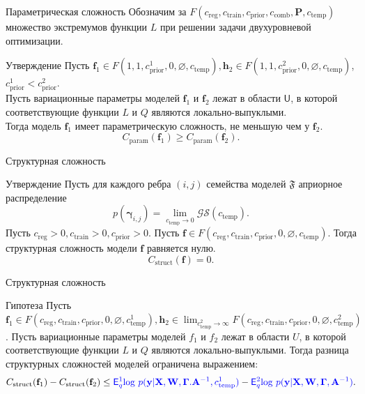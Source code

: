 \documentclass[usenames,dvipsnames,10pt,pdf,utf8,russian,aspectratio=43]{beamer}
\begin{document}
\begin{frame}{Параметрическая сложность}
Обозначим за $F(c_{\text{reg}}, c_{\text{train}}, c_{\text{prior}}, c_{\text{comb}}, \mathbf{P}, c_{\text{temp}})$ множество экстремумов функции $L$ при решении задачи двухуровневой оптимизации.
\begin{block}{Утверждение}
Пусть $\mathbf{f}_1 \in F(1, 1, c_{\text{prior}}^1, 0, \varnothing,  c_{\text{temp}} ), \mathbf{h}_2 \in F(1, 1, c_{\text{prior}}^2, 0, \varnothing,  c_{\text{temp}})$, $c_{\text{prior}}^1 < c_{\text{prior}}^2$.\\
Пусть вариационные параметры моделей $\mathbf{f}_1$ и $\mathbf{f}_2$ лежат в области $\mathsf{U}$, в которой соответствующие функции $L$ и $Q$ являются локально-выпуклыми.\\ 
Тогда модель $\mathbf{f}_1$ имеет параметрическую сложность, не меньшую чем у $\mathbf{f}_2$.
\[
    C_\text{param}(\mathbf{f}_1) \geq C_\text{param}(\mathbf{f}_2).
\]
\end{block}


\end{frame}

\begin{frame}{Структурная сложность}

\begin{block}{Утверждение}
Пусть для каждого ребра $(i,j)$ семейства моделей $\mathfrak{F}$ априорное распределение $$p(\boldsymbol{\gamma}_{i,j}) =  \lim_{c_{\text{temp}} \to 0} \mathcal{GS}(c_{\text{temp}}).$$
Пусть $c_{\text{reg}} >0, c_{\text{train}} >0, c_{\text{prior}}>0$.
Пусть $\mathbf{f} \in F(c_{\text{reg}}, c_{\text{train}}, c_{\text{prior}}, 0, \varnothing, c_{\text{temp}})$.
Тогда структурная сложность модели $\mathbf{f}$ равняется нулю.
\[
    C_\text{struct}(\mathbf{f}) = 0.
\]
\end{block}
\end{frame}

\begin{frame}{Структурная сложность}
\begin{block}{Гипотеза}
Пусть $\mathbf{f}_1 \in F(c_{\text{reg}}, c_{\text{train}},  c_{\text{prior}}, 0, \varnothing,  c^1_{\text{temp}}), \mathbf{h}_2   \in \lim_{c^2_{\text{temp}} \to \infty} F(c_{\text{reg}}, c_{\text{train}},  c_{\text{prior}}, 0, \varnothing,  c^2_{\text{temp}})$.
Пусть вариационные параметры моделей $f_1$ и $f_2$ лежат в области $U$, в которой соответствующие функции $L$ и $Q$ являются локально-выпуклыми. 
Тогда разница структурных сложностей моделей ограничена выражением:
\[
    C_\text{struct}(\mathbf{f}_1)  - C_\text{struct}(\mathbf{f}_2) \leq \textcolor{blue}{\mathsf{E}_q^1 \text{log}~{p(\mathbf{y} | \mathbf{X}, \mathbf{W}, \boldsymbol{\Gamma}. \mathbf{A}^{-1}, c^1_{\text{temp}})}} - \textcolor{blue}{\mathsf{E}_q^2 \text{log}~{p(\mathbf{y} | \mathbf{X}, \mathbf{W}, \boldsymbol{\Gamma}, \mathbf{A}^{-1})}}.
\]
\end{block}

\end{frame}
\end{document}
